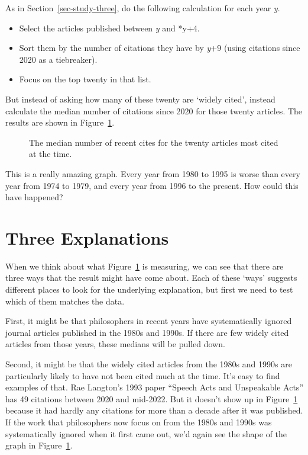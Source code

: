 \documentclass[
  10pt,
  letterpaper,
  DIV=11,
  numbers=noendperiod,
  twoside]{scrartcl}
\providecommand{\tightlist}{%
  \setlength{\itemsep}{0pt}\setlength{\parskip}{0pt}}\usepackage{longtable,booktabs,array}
\begin{document}
As in Section~\ref{sec-study-three}, do the following calculation for
each year \emph{y}.

\begin{itemize}
\tightlist
\item
  Select the articles published between \emph{y} and *y+4.
\item
  Sort them by the number of citations they have by \emph{y}+9 (using
  citations since 2020 as a tiebreaker).
\item
  Focus on the top twenty in that list.
\end{itemize}

But instead of asking how many of these twenty are `widely cited',
instead calculate the median number of citations since 2020 for those
twenty articles. The results are shown in Figure~\ref{fig-all-median}.

\begin{figure}


\caption{\label{fig-all-median}The median number of recent cites for the
twenty articles most cited at the time.}

\end{figure}%

This is a really amazing graph. Every year from 1980 to 1995 is worse
than every year from 1974 to 1979, and every year from 1996 to the
present. How could this have happened?

\section{Three Explanations}\label{sec-three-explanations}

When we think about what Figure~\ref{fig-all-median} is measuring, we
can see that there are three ways that the result might have come about.
Each of these `ways' suggests different places to look for the
underlying explanation, but first we need to test which of them matches
the data.

First, it might be that philosophers in recent years have systematically
ignored journal articles published in the 1980s and 1990s. If there are
few widely cited articles from those years, these medians will be pulled
down.

Second, it might be that the widely cited articles from the 1980s and
1990s are particularly likely to have not been cited much at the time.
It's easy to find examples of that. Rae Langton's 1993 paper ``Speech
Acts and Unspeakable Acts'' has 49 citations between 2020 and mid-2022.
But it doesn't show up in Figure~\ref{fig-all-median} because it had
hardly any citations for more than a decade after it was published. If
the work that philosophers now focus on from the 1980s and 1990s was
systematically ignored when it first came out, we'd again see the shape
of the graph in Figure~\ref{fig-all-median}.
\end{document}

